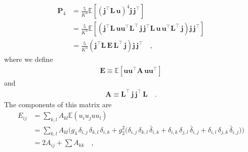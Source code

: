 \documentclass[modern]{aastex62}
\begin{document}
    \begin{align}
        \mathbf{P}_4 & = \frac{5}{K^4}\mathbb{E}\left[ \left(\mathbf{j}^\top \mathbf{L} \, \mathbf{u}\right)^4 \mathbf{j} \, \mathbf{j}^\top \right]
        \nonumber                                                                                                                                                                                                                                                                                 \\
                     & = \frac{5}{K^4}\mathbb{E}\left[\left(\mathbf{j}^\top \mathbf{L} \,  \mathbf{u} \mathbf{u}^\top  \mathbf{L}^\top \, \mathbf{j} \, \mathbf{j}^\top \mathbf{L} \,  \mathbf{u} \, \mathbf{u}^\top  \mathbf{L}^\top \, \mathbf{j} \right) \mathbf{j} \, \mathbf{j}^\top \right]
        \nonumber                                                                                                                                                                                                                                                                                 \\
                     & = \frac{5}{K^4}\left(\mathbf{j}^\top \mathbf{L} \, \mathbf{E} \, \mathbf{L}^\top \, \mathbf{j} \right) \mathbf{j} \, \mathbf{j}^\top
        \quad,
    \end{align}
    where we define
    \begin{align}
        \mathbf{E} \equiv \mathbb{E}\left[ \mathbf{u} \mathbf{u}^\top  \mathbf{A} \,  \mathbf{u} \mathbf{u}^\top \right]
    \end{align}
    and
    \begin{align}
        \mathbf{A} \equiv \mathbf{L}^\top \, \mathbf{j} \, \mathbf{j}^\top \, \mathbf{L}
        \quad.
    \end{align}
    The components of this matrix are
    \begin{align}
        E_{ij} & =
        \sum\limits_{k,l}A_{kl} \mathbb{E}(u_i u_j u u_l)
        \nonumber  \\
               & =
        \sum\limits_{k,l}A_{kl}
        \Big(
        g_4 \, \delta_{i, j} \, \delta_{k, l} \, \delta_{i, k}
        +
        g_2^2 \big(
            \delta_{i, j} \, \delta_{k, l} \, \bar{\delta}_{i, k}
            +
            \delta_{i, k} \, \delta_{j, l} \, \bar{\delta}_{i, j}
            +
            \delta_{i, l} \, \delta_{j, k} \, \bar{\delta}_{i, j}
            \big)
        \Big)
        \nonumber  \\
               & =
        2 A_{ij} + \sum\limits A_{kk}
        \quad,
    \end{align}
\end{document}
